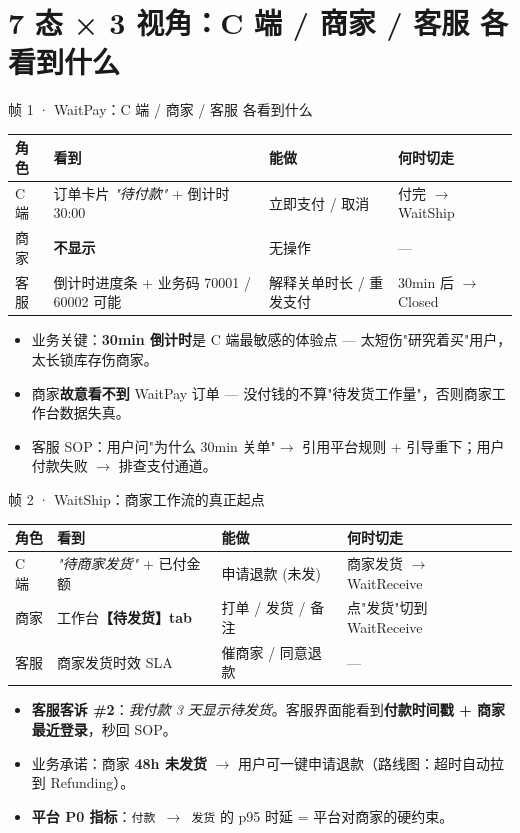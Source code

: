 \documentclass[aspectratio=169,11pt]{beamer}
\begin{document}
\section{7 态 × 3 视角：C 端 / 商家 / 客服 各看到什么}

\begin{frame}[shrink]{帧 1 · WaitPay：C 端 / 商家 / 客服 各看到什么}
{\footnotesize
\begin{tabular}{@{}lp{3.5cm}p{3cm}p{3cm}@{}}
\toprule
角色 & 看到 & 能做 & 何时切走 \\
\midrule
C 端 & 订单卡片 \textit{"待付款"} + 倒计时 30:00 & 立即支付 / 取消 & 付完 $\to$ WaitShip \\
商家 & \textbf{不显示} & 无操作 & — \\
客服 & 倒计时进度条 + 业务码 70001 / 60002 可能 & 解释关单时长 / 重发支付 & 30min 后 $\to$ Closed \\
\bottomrule
\end{tabular}}
\vspace{2mm}
\begin{itemize}
  \item 业务关键：\textbf{30min 倒计时}是 C 端最敏感的体验点 — 太短伤"研究着买"用户，太长锁库存伤商家。
  \item 商家\textbf{故意看不到} WaitPay 订单 — 没付钱的不算"待发货工作量"，否则商家工作台数据失真。
  \item 客服 SOP：用户问"为什么 30min 关单"$\to$ 引用平台规则 + 引导重下；用户付款失败 $\to$ 排查支付通道。
\end{itemize}
\end{frame}

\begin{frame}[shrink]{帧 2 · WaitShip：商家工作流的真正起点}
{\footnotesize
\begin{tabular}{@{}lp{3.5cm}p{3cm}p{3cm}@{}}
\toprule
角色 & 看到 & 能做 & 何时切走 \\
\midrule
C 端 & \textit{"待商家发货"} + 已付金额 & 申请退款 (未发) & 商家发货 $\to$ WaitReceive \\
商家 & 工作台\textbf{【待发货】tab} & 打单 / 发货 / 备注 & 点"发货"切到 WaitReceive \\
客服 & 商家发货时效 SLA & 催商家 / 同意退款 & — \\
\bottomrule
\end{tabular}}
\vspace{2mm}
\begin{itemize}
  \item \textbf{客服客诉 \#2}：\textit{我付款 3 天显示待发货}。客服界面能看到\textbf{付款时间戳 + 商家最近登录}，秒回 SOP。
  \item 业务承诺：商家 \textbf{48h 未发货} $\to$ 用户可一键申请退款（路线图：超时自动拉到 Refunding）。
  \item \textbf{平台 P0 指标}：\texttt{付款 $\to$ 发货} 的 p95 时延 = 平台对商家的硬约束。
\end{itemize}
\end{frame}
\end{document}
